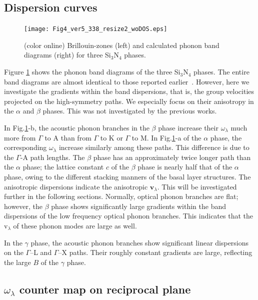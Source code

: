 \documentclass[twocolumn,amsmath,amssymb,a4paper,prb,superscriptaddress,floatfix]{revtex4-1}
\begin{document}
\subsection{Dispersion curves}

\begin{figure}[ht]
 \begin{center}
  \texttt{[image: Fig4\_ver5\_338\_resize2\_woDOS.eps]}
  \caption{(color online) Brillouin-zones (left) and calculated phonon band diagrams (right) for three Si$_3$N$_4$ phases.
  \label{fig:Fig4_ver5_338} }
 \end{center}
\end{figure}

Figure \ref{fig:Fig4_ver5_338} shows the phonon band diagrams of the three
Si$_3$N$_4$ phases. The entire band diagrams are almost identical to those
reported earlier~\cite{kuwabara,xu}. However, here we investigate the gradients
within the band dispersions, that is, the group velocities projected on the
high-symmetry paths. We especially focus on their anisotropy in the $\alpha$ and
$\beta$ phases. This was not investigated by the previous works.

In Fig.\ref{fig:Fig4_ver5_338}-b, the acoustic phonon branches in the $\beta$
phase increase their $\omega_\lambda$ much more from $\Gamma$ to A than from
$\Gamma$ to K or $\Gamma$ to M. In Fig.\ref{fig:Fig4_ver5_338}-a of the $\alpha$
phase, the corresponding $\omega_\lambda$ increase similarly among these paths.
This difference is due to the $\Gamma$-A path lengths.  The $\beta$ phase has an
approximately twice longer path than the $\alpha$ phase; the lattice constant
$c$ of the $\beta$ phase is nearly half that of the $\alpha$ phase, owing to the
different stacking manners of the basal layer structures.  The anisotropic
dispersions indicate the anisotropic $\mathbf{v}_\lambda$. This will be
investigated further in the following sections.  Normally, optical phonon
branches are flat; however, the $\beta$ phase shows significantly large
gradients within the band dispersions of the low frequency optical phonon branches.
This indicates that the \rm{v}$_{\lambda}$ of these phonon modes are large as well.

In the $\gamma$ phase, the acoustic phonon branches show significant linear
dispersions on the $\Gamma$--L and $\Gamma$--X paths.  Their roughly constant
gradients are large, reflecting the large $B$ of the $\gamma$ phase.

\subsection{$\omega_\lambda$ counter map on reciprocal plane}
\end{document}
